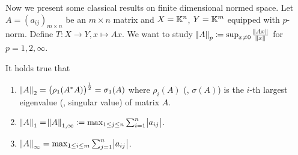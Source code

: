 Now we present some classical results on finite dimensional normed space. 
Let $A = (a_{ij})_{m \times n}$ be an $m \times n$ matrix and $X = \mathbb{K}^n$, 
$Y = \mathbb{K}^m$ equipped with $p$-norm. 
Define $T: X \to Y, x \mapsto Ax$. 
We want to study $\norm{A}_p \coloneqq \sup_{x \neq 0} 
\frac{\norm{Ax}}{\norm{x}}$ for $p = 1, 2, \infty$. 
\begin{thm}
It holds true that
\begin{enumerate}
    \item \label{thm:bounded_linear_operator:matrix_norms:p2}
    $\norm{A}_2 = \left( \rho_1(A^\ast A) \right) ^\frac{1}{2} 
    = \sigma_1(A)$ where $\rho_i(A)$ (\resp, $\sigma(A)$) is the $i$-th largest eigenvalue 
    (\resp, singular value) of matrix $A$. 
    \item \label{thm:bounded_linear_operator:matrix_norms:p1}
    $\norm{A}_1 = \norm{A}_{1, \infty} \coloneqq \max_{1 \le j \le n} \sum_{i=1}^{n} \abs{a_{ij}}$. 
    \item \label{thm:bounded_linear_operator:matrix_norms:p_infinity}
    $\norm{A}_\infty = \max_{1 \le i \le m} \sum_{j=1}^{n} \abs{a_{ij}}$. 
\end{enumerate} 
\end{thm}
